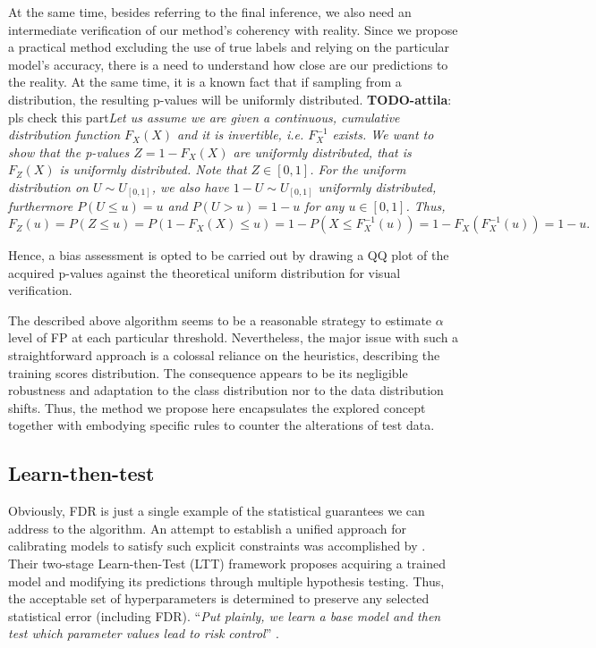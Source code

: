 \documentclass{article}
\newcommand{\todo}[2]{{\color{red} {\bf TODO-#1}: #2}}
\begin{document}
At the same time, besides referring to the final inference, we also need an intermediate verification of our method's coherency with reality. Since we propose a practical method excluding the use of true labels and relying on the particular model's accuracy, there is a need to understand how close are our predictions to the reality. At the same time, it is a known fact that if sampling from a distribution, the resulting p-values will be uniformly distributed. \todo{attila}{pls check this part}\textit{Let us assume we are given a continuous, cumulative distribution function $F_X(X)$ and it is invertible, i.e. $F_X^{-1}$ exists. We want to show that the p-values $Z = 1-F_X(X)$ are uniformly distributed, that is $F_Z(X)$ is uniformly distributed. Note that $Z\in [0,1]$. For the uniform distribution on $U\sim U_{[0,1]}$, we also have $1-U\sim U_{[0,1]}$ uniformly distributed, furthermore $P(U\le u)=u$ and $P(U>u) = 1-u$ for any $u\in[0,1]$. Thus,}
\begin{equation}
	F_Z(u)=P(Z \le u) = P(1-F_X(X)\le u)= 1-P(X\le F_X^{-1}(u))=1-F_X(F_X^{-1}(u))=1-u.
\end{equation}

Hence, a bias assessment is opted to be carried out by drawing a QQ plot of the acquired p-values against the theoretical uniform distribution for visual verification.

The described above algorithm seems to be a reasonable strategy to estimate $\alpha$ level of FP at each particular threshold. Nevertheless, the major issue with such a straightforward approach is a colossal reliance on the heuristics, describing the training scores distribution. The consequence appears to be its negligible robustness and adaptation to the class distribution nor to the data distribution shifts. Thus, the method we propose here 
encapsulates the explored concept together with embodying specific rules to counter the alterations of test data.

\subsection{Learn-then-test}

Obviously, FDR is just a single example of the statistical guarantees we can address to the algorithm. An attempt to establish a unified approach for calibrating models to satisfy such explicit constraints was accomplished by \textcite{ltt}. Their two-stage Learn-then-Test (LTT) framework proposes acquiring a trained model and modifying its predictions through multiple hypothesis testing. Thus, the acceptable set of hyperparameters is determined to preserve any selected statistical error (including FDR). “\textit{Put plainly, we learn a base model and then test which parameter values lead to risk control}” \cite{ltt}. 
\end{document}
